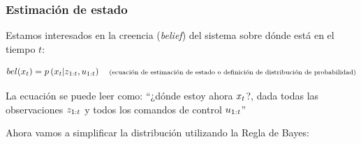 \begin{frame}
    \frametitle{Estimación de estado}
    
    Estamos interesados en la creencia (\emph{belief}) del sistema sobre dónde está en el tiempo $t$:
    
    \begin{equation*}
    bel(x_{t}) = p\left(x_{t} | z_{1:t}, u_{1:t} \right) \quad \text{\scriptsize (ecuación de estimación de estado o definición de distribución de probabilidad)}
    \end{equation*}
    
    La ecuación se puede leer como: ``¿dónde estoy ahora $x_{t}$?, dada todas las observaciones $z_{1:t}$ y todos los comandos de control $u_{1:t}$''
    
    \vspace{1cm}
    
    Ahora vamos a simplificar la distribución utilizando la Regla de Bayes:

\end{frame}


